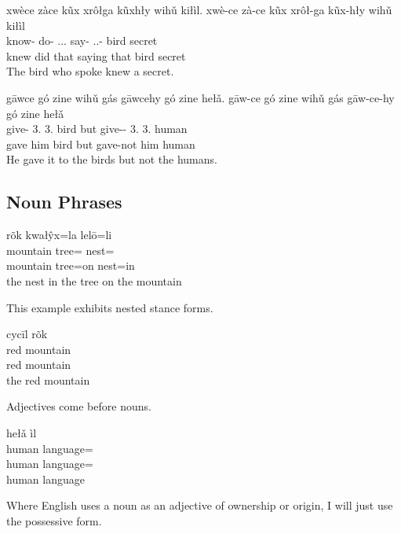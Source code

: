 \begin{exe}
    \ex
    xwèce zàce kũx xrôłga kũxhły wihǔ kiłìl.
    \glll
    xwè-ce zà-ce kũx xrôł-ga kũx-hły wihǔ kiłìl \\
    know-\Pst{} do-\Pst{} \Dem{}.\Anim{}.\Dist{}.\Sg{} say-\Ger{} \Dem{}.\Anim{}.\Dist{}-\Adj{} bird secret \\
    knew did that saying that bird secret \\
    \glt
    The bird who spoke knew a secret.
\end{exe}

\begin{exe}
    \ex
    gāwce gó zine wihǔ gás gāwcehy gó zine hełǎ.
    \glll
    gāw-ce gó zine wihǔ gás gāw-ce-hy gó zine hełǎ \\
    give-\Pst{} 3\Sg{}.\Anim{} 3\Sg{}.\Inanim{} bird but give-\Pst{}-\Neg{} 3\Sg{}.\Anim{} 3\Sg{}.\Inanim{} human \\
    gave him bird but gave-not him human \\
    \glt
    He gave it to the birds but not the humans.
\end{exe}

\subsection{Noun Phrases}\label{subsec:noun-phrases}

\begin{exe}
    \ex
    \glll
    rõk kwałŷx=la lelō=li \\
    mountain tree=\AdessThree{} nest=\InessThree{} \\
    mountain tree=on nest=in \\
    \glt
    the nest in the tree on the mountain
\end{exe}
This example exhibits nested stance forms.

\begin{exe}
    \ex
    \glll
    cycīl rõk \\
    red mountain \\
    red mountain \\
    \glt
    the red mountain
\end{exe}
Adjectives come before nouns.

\begin{exe}
    \ex
    \glll
    hełǎ ìl \\
    human language=\Poss{} \\
    human language=\Poss{} \\
    \glt
    human language
\end{exe}
Where English uses a noun as an adjective of ownership or origin,
I will just use the possessive form.

